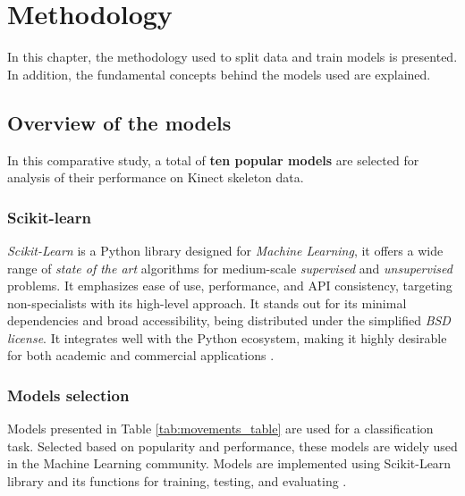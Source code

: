 \hypersetup{colorlinks=true, linkcolor=blue, citecolor=red}

\chapter{Methodology} \label{chap:methodology}

    In this chapter, the methodology used to split data and train models is presented. In addition, the fundamental concepts behind the models used are explained.

    \section{Overview of the models}

        In this comparative study, a total of \textbf{ten popular models} are selected for analysis of their performance on Kinect skeleton data.

        \subsection{Scikit-learn}  

            \textit{Scikit-Learn} is a Python library designed for \textit{Machine Learning}, it offers a wide range of \textit{state of the art} algorithms for medium-scale \textit{supervised} and \textit{unsupervised} problems. It emphasizes ease of use, performance, and API consistency, targeting non-specialists with its high-level approach. It stands out for its minimal dependencies and broad accessibility, being distributed under the simplified \textit{BSD license}. It integrates well with the Python ecosystem, making it highly desirable for both academic and commercial applications \cite{scikit-learn}.

        \subsection{Models selection}

        Models presented in Table \ref{tab:movements_table} are used for a classification task. Selected based on popularity and performance, these models are widely used in the Machine Learning community. Models are implemented using Scikit-Learn library and its functions for training, testing, and evaluating \cite{sklearn_api}. 

        \newpage 

